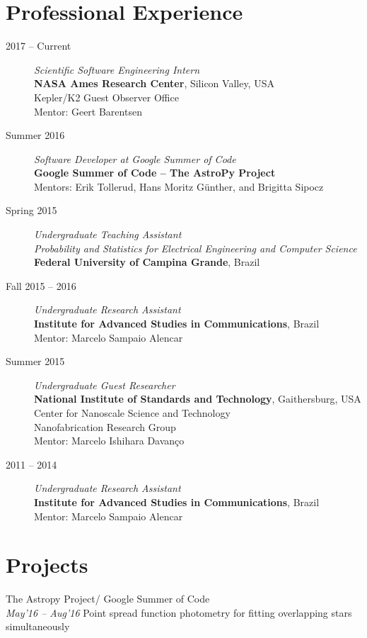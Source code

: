 \documentclass[10pt]{article}
\begin{document}
\begin{titlepage}
\section*{Professional Experience}
\begin{description}
\item[2017 -- Current] \emph{Scientific Software Engineering Intern}
\\\textbf{NASA Ames Research Center}, Silicon Valley, USA
\\Kepler/K2 Guest Observer Office
\\Mentor: Geert Barentsen
\item[Summer 2016] \emph{Software Developer at Google Summer of Code}
\\\textbf{Google Summer of Code -- The AstroPy Project}
\\Mentors: Erik Tollerud, Hans Moritz G\"unther, and Brigitta Sipocz
\item[Spring 2015] \emph{Undergraduate Teaching Assistant}
\\ \emph{Probability and Statistics for Electrical Engineering and Computer Science}
\\\textbf{Federal University of Campina Grande}, Brazil
\item[Fall 2015 -- 2016] \emph{Undergraduate Research Assistant}
\\\textbf{Institute for Advanced Studies in Communications}, Brazil
\\Mentor: Marcelo Sampaio Alencar
\item[Summer 2015] \emph{Undergraduate Guest Researcher}
\\\textbf{National Institute of Standards and Technology}, Gaithersburg, USA
\\Center for Nanoscale Science and Technology
\\Nanofabrication Research Group
\\Mentor: Marcelo Ishihara Davan\c co
\item[2011 -- 2014] \emph{Undergraduate Research Assistant}
\\\textbf{Institute for Advanced Studies in Communications}, Brazil
\\Mentor: Marcelo Sampaio Alencar
\end{description}

\section*{Projects}

    \begin{minipage}[b]{18cm}
    The Astropy Project/ Google Summer of Code\\
        \emph{May'16 -- Aug'16} Point spread function photometry for fitting overlapping stars simultaneously
    \end{minipage}\\


\end{titlepage}
\end{document}
